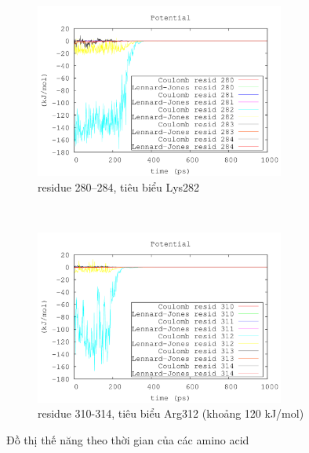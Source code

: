 \documentclass[12pt,a4paper,reqno, oneside]{book}
\begin{document}
\begin{figure}[h!]
\begin{subfigure}{\textwidth}
\includegraphics[width=0.9\textwidth,natwidth=610,natheight=642]{280-284}
\caption{\gls{residue} 280--284, tiêu biểu Lys282}
\label{fig:282}
\end{subfigure}\\
\begin{subfigure}{\textwidth}
\includegraphics[width=0.9\textwidth,natwidth=610,natheight=642]{310-314}
\caption{\gls{residue} 310-314, tiêu biểu Arg312 (khoảng 120 kJ/mol)}
\label{fig:312}
\end{subfigure}
\caption{Đồ thị thế năng theo thời gian của các amino acid}
\label{fig:Coulomb2}
\end{figure}
\end{document}
